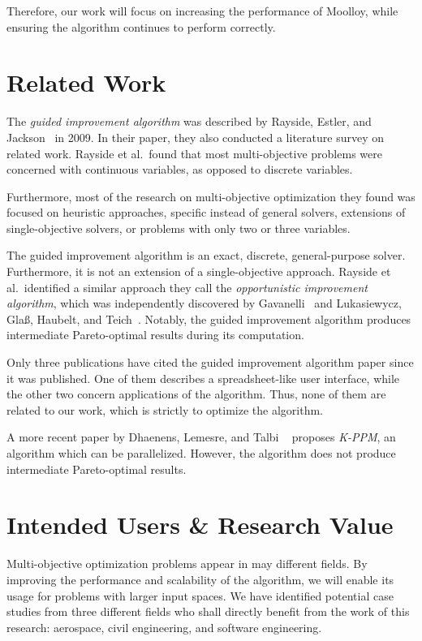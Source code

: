 \documentclass[11pt]{article}
\theoremstyle{definition}
\begin{document}
Therefore, our work will focus on increasing the performance of
Moolloy, while ensuring the algorithm continues to perform correctly.


\section{Related Work}\label{sec:related_work}

The \textit{guided improvement algorithm} was described by Rayside,
Estler, and Jackson~\cite{ref:Rayside09} in 2009. In their paper, they
also conducted a literature survey on related work. Rayside et al.\
found that most multi-objective problems were concerned with continuous
variables, as opposed to discrete variables.

Furthermore, most of the research on multi-objective optimization they
found was focused on heuristic approaches, specific instead of general
solvers, extensions of single-objective solvers, or problems with only
two or three variables.

The guided improvement algorithm is an exact, discrete, general-purpose
solver. Furthermore, it is not an extension of a single-objective
approach. Rayside et al.\ identified a similar approach they call the
\textit{opportunistic improvement algorithm}, which was independently
discovered by Gavanelli~\cite{ref:Gavanelli02} and Lukasiewycz, Gla\ss,
Haubelt, and Teich~\cite{ref:Lukas07}. Notably, the guided improvement
algorithm produces intermediate Pareto-optimal results during its
computation.

Only three publications have cited the guided improvement algorithm
paper since it was published. One of them describes a spreadsheet-like
user interface, while the other two concern applications of the
algorithm. Thus, none of them are related to our work, which is
strictly to optimize the algorithm.

A more recent paper by Dhaenens, Lemesre, and Talbi ~\cite{ref:kppm}
proposes \textit{\mbox{K-PPM}}, an algorithm which can be parallelized.
However, the algorithm does not produce intermediate Pareto-optimal
results.


\section{Intended Users \& Research Value}\label{sec:research_val}
Multi-objective optimization problems appear in may different fields.
By improving the performance and scalability of the algorithm, we will
enable its usage for problems with larger input spaces. We have
identified potential case studies from three different fields who shall directly benefit from the work of this research:
aerospace, civil engineering, and software engineering.
\end{document}
